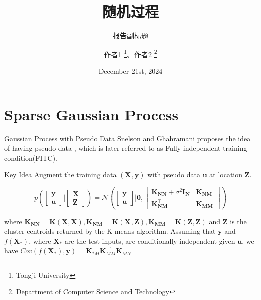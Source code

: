 \documentclass{beamer}
\title{随机过程}
\subtitle{报告副标题}
\author{作者1 \thanks{Tongji University}、作者2 \thanks{Department of Computer Science and Technology}}
\date{December 21st, 2024}
\begin{document}
\maketitle

\section{Sparse Gaussian Process}
\begin{frame}{Gaussian Process with Pseudo Data}
Snelson and Ghahramani proposes the idea of having pseudo data\cite{NIPS2005_4491777b} , which is later referred to as Fully independent training condition(FITC).

\begin{block}{Key Idea}
Augment the training data $(\mathbf{X},\mathbf{y})$ with pseudo data $\mathbf{u}$ at location $\mathbf{Z}$.

\[
      p\left(
            \begin{bmatrix}
            \mathbf{y} \\ \mathbf{u}
            \end{bmatrix}
            \Bigg| 
            \begin{bmatrix}
            \mathbf{X} \\ \mathbf{Z}
            \end{bmatrix}
            \right)
            =
            \mathcal{N}\left(
            \begin{bmatrix}
            \mathbf{y} \\ \mathbf{u}
            \end{bmatrix}\Bigg|
            \mathbf{0}, 
            \begin{bmatrix}
            \mathbf{K}_{\mathbf{NN}}+\sigma^2\mathbf{I}_{\mathbf{N}} & \mathbf{K}_{\mathbf{NM}} \\
            \mathbf{K}_{\mathbf{NM}}^\top & \mathbf{K}_{\mathbf{MM}}
            \end{bmatrix}
            \right)
\]

where
$\mathbf{K}_{\mathbf{NN}} = \mathbf{K}(\mathbf{X}, \mathbf{X}),
\mathbf{K}_{\mathbf{NM}} = \mathbf{K}(\mathbf{X}, \mathbf{Z}),
\mathbf{K}_{\mathbf{MM}} = \mathbf{K}(\mathbf{Z}, \mathbf{Z})$ and $\mathbf{Z}$ is the cluster centroids returned by the K-means algorithm.
Assuming that $\mathbf{y}$ and $f(\mathbf{X}_*)$, where $\mathbf{X}_*$ are the test inputs, are conditionally independent given $\mathbf{u}$, we have
$Cov(f(\mathbf{X}_*),\mathbf{y}) = \mathbf{K}_{*M}\mathbf{K}_{MM}^{-1}\mathbf{K}_{MN}$

\end{block}
\end{frame}
\end{document}
